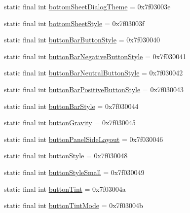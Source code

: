 \begin{DoxyCompactItemize}
static final int \mbox{\hyperlink{classandroid_1_1support_1_1design_1_1R_1_1attr_ace2cb111acbe24b3c9641a3fd77ef369}{bottom\+Sheet\+Dialog\+Theme}} = 0x7f03003e
\item 
static final int \mbox{\hyperlink{classandroid_1_1support_1_1design_1_1R_1_1attr_adcad9a53f8c39a262eff4fa7e1f02604}{bottom\+Sheet\+Style}} = 0x7f03003f
\item 
static final int \mbox{\hyperlink{classandroid_1_1support_1_1design_1_1R_1_1attr_a3a9d5900929a564d36943910be6f5f8e}{button\+Bar\+Button\+Style}} = 0x7f030040
\item 
static final int \mbox{\hyperlink{classandroid_1_1support_1_1design_1_1R_1_1attr_ad684421bc3fb71c6503b0b9a0ba2474b}{button\+Bar\+Negative\+Button\+Style}} = 0x7f030041
\item 
static final int \mbox{\hyperlink{classandroid_1_1support_1_1design_1_1R_1_1attr_af941874bd15ba48802fe339d3aed2e67}{button\+Bar\+Neutral\+Button\+Style}} = 0x7f030042
\item 
static final int \mbox{\hyperlink{classandroid_1_1support_1_1design_1_1R_1_1attr_adfdaff8d5b88aedcb767a3d361b26536}{button\+Bar\+Positive\+Button\+Style}} = 0x7f030043
\item 
static final int \mbox{\hyperlink{classandroid_1_1support_1_1design_1_1R_1_1attr_aa0cd4b2b184796faaa8598d7d55a1980}{button\+Bar\+Style}} = 0x7f030044
\item 
static final int \mbox{\hyperlink{classandroid_1_1support_1_1design_1_1R_1_1attr_a75311b0c5dc69c448a21375dea186e57}{button\+Gravity}} = 0x7f030045
\item 
static final int \mbox{\hyperlink{classandroid_1_1support_1_1design_1_1R_1_1attr_af8a569d126f3f38713edd8c55471112d}{button\+Panel\+Side\+Layout}} = 0x7f030046
\item 
static final int \mbox{\hyperlink{classandroid_1_1support_1_1design_1_1R_1_1attr_af811016b90d459ec8303bdee577b3bbe}{button\+Style}} = 0x7f030048
\item 
static final int \mbox{\hyperlink{classandroid_1_1support_1_1design_1_1R_1_1attr_a6229dc8c52c9cb2bb1b60ae629a23df8}{button\+Style\+Small}} = 0x7f030049
\item 
static final int \mbox{\hyperlink{classandroid_1_1support_1_1design_1_1R_1_1attr_a481984709e9647ce5d7948243edfe917}{button\+Tint}} = 0x7f03004a
\item 
static final int \mbox{\hyperlink{classandroid_1_1support_1_1design_1_1R_1_1attr_a47b2fd06b59f201a643295986397e47a}{button\+Tint\+Mode}} = 0x7f03004b
\item 

\end{DoxyCompactItemize}
